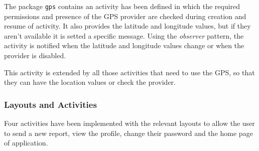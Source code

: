 \documentclass[a4paper,12pt]{report}
\begin{document}
The package \texttt{gps} contains an activity has been defined in which the required permissions and presence of the GPS provider are checked during creation and resume of activity. It also provides the latitude and longitude values, but if they aren't available it is setted a specific message. Using the \emph{observer} pattern, the activity is notified when the latitude and longitude values change or when the provider is disabled.

This activity is extended by all those activities that need to use the GPS, so that they can have the location values or check the provider.

\subsubsection{Layouts and Activities}
Four activities have been implemented with the relevant layouts to allow the user to send a new report, view the profile, change their password and the home page of application.
\end{document}
